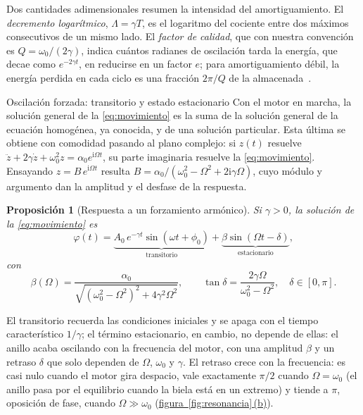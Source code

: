 \documentclass[a4paper,11pt]{amsart}
\makeatletter
\def\subsection{\@startsection{subsection}{2}%
  \z@{.9\linespacing\@plus.6\linespacing}{.3\linespacing}%
  {\normalfont\bfseries\color{azulprof}}}
\numberwithin{equation}{section}
\newcommand{\ii}{\mathrm{i}}                  %
\newcommand{\wz}{\omega_0}                    %
\newcommand{\wa}{\omega}                      %
\theoremstyle{cienplano}
\newtheorem{proposicion}{Proposición}[section]
\theoremstyle{ciendef}
\theoremstyle{cienobs}
\newcommand{\figpanel}[2]{\hyperref[#1]{figura~\ref*{#1}\,\textup{(#2)}}}
\makeatother
\begin{document}
Dos cantidades adimensionales resumen la intensidad del amortiguamiento. El
\emph{decremento logarítmico}, $\Lambda=\gamma T$, es el logaritmo del cociente
entre dos máximos consecutivos de un mismo lado. El \emph{factor de calidad},
que con nuestra convención es $Q=\wz/(2\gamma)$, indica cuántos radianes de
oscilación tarda la energía, que decae como $e^{-2\gamma t}$, en reducirse en
un factor $e$; para amortiguamiento débil, la energía perdida en cada ciclo es
una fracción $2\pi/Q$ de la almacenada~\cite{FIV}.

\subsection{Oscilación forzada: transitorio y estado estacionario}\label{sec:forzada}
Con el motor en marcha, la solución general de la \cref{eq:movimiento} es la
suma de la solución general de la ecuación homogénea, ya conocida, y de una
solución particular. Esta última se obtiene con comodidad pasando al plano
complejo: si $z(t)$ resuelve
$\ddot z+2\gamma\dot z+\wz^{2}z=\alpha_0e^{\ii\Omega t}$, su parte imaginaria
resuelve la \cref{eq:movimiento}. Ensayando $z=B\,e^{\ii\Omega t}$ resulta
$B=\alpha_0/(\wz^{2}-\Omega^{2}+2\ii\gamma\Omega)$, cuyo módulo y argumento dan
la amplitud y el desfase de la respuesta.

\begin{proposicion}[Respuesta a un forzamiento armónico]\label{prop:forzada}
Si $\gamma>0$, la solución de la \cref{eq:movimiento} es
\begin{equation}\label{eq:forzada}
  \varphi(t)=
  \underbrace{A_0\,e^{-\gamma t}\sin(\wa t+\phi_0)}_{\text{transitorio}}
  +\underbrace{\beta\sin(\Omega t-\delta)}_{\text{estacionario}},
\end{equation}
con
\begin{equation}\label{eq:beta}
  \beta(\Omega)=\frac{\alpha_0}{\sqrt{\left(\wz^{2}-\Omega^{2}\right)^{2}+4\gamma^{2}\Omega^{2}}},
  \qquad
  \tan\delta=\frac{2\gamma\Omega}{\wz^{2}-\Omega^{2}},\quad \delta\in[0,\pi].
\end{equation}
\end{proposicion}

El transitorio recuerda las condiciones iniciales y se apaga con el tiempo
característico $1/\gamma$; el término estacionario, en cambio, no depende de
ellas: el anillo acaba oscilando con la frecuencia del motor, con una amplitud
$\beta$ y un retraso $\delta$ que solo dependen de $\Omega$, $\wz$ y $\gamma$.
El retraso crece con la frecuencia: es casi nulo cuando el motor gira despacio,
vale exactamente $\pi/2$ cuando $\Omega=\wz$ (el anillo pasa por el
equilibrio cuando la biela está en un extremo) y tiende a $\pi$, oposición de
fase, cuando $\Omega\gg\wz$ (\figpanel{fig:resonancia}{b}).
\end{document}

